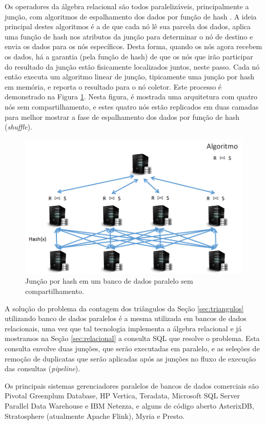Os operadores da álgebra relacional são todos paralelizáveis, principalmente
a junção, com algoritmos de espalhamento dos dados por função de hash 
\cite{Schneider1989}. A ideia principal destes algoritmos é a de que cada 
nó lê sua parcela dos dados, aplica uma função de hash nos atributos da
junção para determinar o nó de destino e envia os dados para os nós específicos.
Desta forma, quando os nós agora recebem os dados, há a garantia (pela
função de hash) de que os nós que irão participar do resultado da junção 
estão fisicamente localizados juntos, neste passo. Cada nó então executa um
algoritmo linear de junção, tipicamente uma junção por hash em memória,
e reporta o resultado para o nó coletor. Este processo é demonstrado na 
Figura \ref{fig:mpp_hashjoin}. Nesta figura, é mostrada uma arquitetura
com quatro nós sem compartilhamento, e estes quatro nós estão replicados 
em duas camadas para melhor mostrar a fase de espalhamento dos dados
por função de hash (\emph{shuffle}).

\begin{figure}[!htbp]
        \centering
        \includegraphics[width=\linewidth]{./mpp_hashjoin.png}
        \caption{Junção por hash em um banco de dados paralelo sem compartilhamento.}
        \label{fig:mpp_hashjoin}
\end{figure}

A solução do problema da contagem dos triângulos da Seção \ref{sec:triangulos} utilizando
banco de dados paralelos é a mesma utilizada em bancos de dados relacionais, uma vez que tal tecnologia 
implementa a álgebra relacional e já mostramos na Seção \ref{sec:relacional}
a consulta SQL que resolve o problema. Esta consulta envolve duas junções, 
que serão executadas em paralelo, e as seleções de remoção de duplicatas que
serão aplicadas após as junções no fluxo de execução das consultas (\emph{pipeline}).

Os principais sistemas gerenciadores paralelos de bancos de dados comerciais são Pivotal Greenplum Database, 
HP Vertica, Teradata, Microsoft SQL Server Parallel Data Warehouse e IBM Netezza, e alguns de código 
aberto AsterixDB, Stratosphere (atualmente Apache Flink), Myria e Presto.

